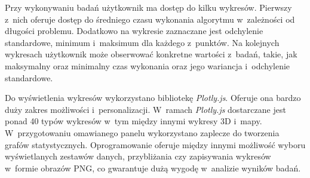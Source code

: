 Przy wykonywaniu badań użytkownik ma dostęp do kilku wykresów. Pierwszy z~nich oferuje dostęp do średniego czasu wykonania algorytmu w~zależności od długości problemu. Dodatkowo na wykresie zaznaczane jest odchylenie standardowe, minimum i~maksimum dla każdego z~punktów. Na kolejnych wykresach użytkownik może obserwować konkretne wartości z~badań, takie, jak maksymalny oraz minimalny czas wykonania oraz jego wariancja i~odchylenie standardowe. 

Do wyświetlenia wykresów wykorzystano bibliotekę \emph{Plotly.js}. Oferuje ona bardzo duży zakres możliwości i~personalizacji.  W~ramach \emph{Plotly.js} dostarczane jest ponad 40 typów wykresów w~tym między innymi wykresy 3D i~mapy. W~przygotowaniu omawianego panelu wykorzystano zaplecze do tworzenia grafów statystycznych. Oprogramowanie oferuje między innymi możliwość wyboru wyświetlanych zestawów danych, przybliżania czy zapisywania wykresów w~formie obrazów PNG, co gwarantuje dużą wygodę w~analizie wyników badań.

